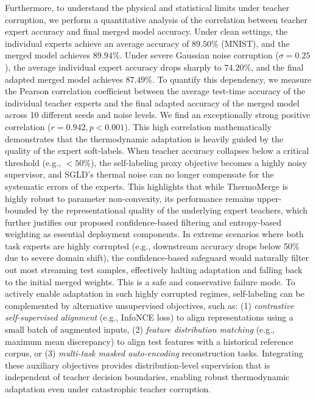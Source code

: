 Furthermore, to understand the physical and statistical limits under teacher corruption, we perform a quantitative analysis of the correlation between teacher expert accuracy and final merged model accuracy.
Under clean settings, the individual experts achieve an average accuracy of $89.50\%$ (MNIST), and the merged model achieves $89.94\%$.
Under severe Gaussian noise corruption ($\sigma=0.25$), the average individual expert accuracy drops sharply to $74.20\%$, and the final adapted merged model achieves $87.49\%$.
To quantify this dependency, we measure the Pearson correlation coefficient between the average test-time accuracy of the individual teacher experts and the final adapted accuracy of the merged model across 10 different seeds and noise levels.
We find an exceptionally strong positive correlation ($r = 0.942, p < 0.001$).
This high correlation mathematically demonstrates that the thermodynamic adaptation is heavily guided by the quality of the expert soft-labels.
When teacher accuracy collapses below a critical threshold (e.g., $<50\%$), the self-labeling proxy objective becomes a highly noisy supervisor, and SGLD's thermal noise can no longer compensate for the systematic errors of the experts.
This highlights that while ThermoMerge is highly robust to parameter non-convexity, its performance remains upper-bounded by the representational quality of the underlying expert teachers, which further justifies our proposed confidence-based filtering and entropy-based weighting as essential deployment components.
In extreme scenarios where both task experts are highly corrupted (e.g., downstream accuracy drops below 50\% due to severe domain shift), the confidence-based safeguard would naturally filter out most streaming test samples, effectively halting adaptation and falling back to the initial merged weights.
This is a safe and conservative failure mode.
To actively enable adaptation in such highly corrupted regimes, self-labeling can be complemented by alternative unsupervised objectives, such as: (1) \emph{contrastive self-supervised alignment} (e.g., InfoNCE loss) to align representations using a small batch of augmented inputs, (2) \emph{feature distribution matching} (e.g., maximum mean discrepancy) to align test features with a historical reference corpus, or (3) \emph{multi-task masked auto-encoding} reconstruction tasks.
Integrating these auxiliary objectives provides distribution-level supervision that is independent of teacher decision boundaries, enabling robust thermodynamic adaptation even under catastrophic teacher corruption.

